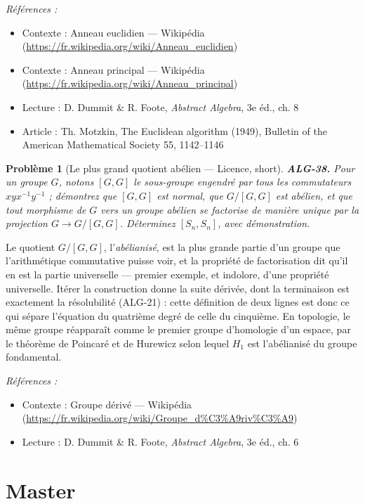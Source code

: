 \documentclass[11pt]{article}
\newtheorem{problem}{Problème}
\newenvironment{refs}{\par\small\noindent\emph{Références :}\begin{itemize}\setlength\itemsep{0pt}}{\end{itemize}\normalsize}
\begin{document}
\begin{refs}
\item Contexte : Anneau euclidien --- Wikipédia (\url{https://fr.wikipedia.org/wiki/Anneau_euclidien})
\item Contexte : Anneau principal --- Wikipédia (\url{https://fr.wikipedia.org/wiki/Anneau_principal})
\item Lecture : D. Dummit \& R. Foote, \textit{Abstract Algebra}, 3e éd., ch. 8
\item Article : Th. Motzkin, \og{} The Euclidean algorithm \fg{} (1949), Bulletin of the American Mathematical Society 55, 1142--1146
\end{refs}

\bigskip

\begin{problem}[{Le plus grand quotient abélien --- Licence, short}]
\textbf{ALG-38.} Pour un groupe $G$, notons $[G,G]$ le sous-groupe engendré par
tous les commutateurs $xyx^{-1}y^{-1}$ ; démontrez que $[G,G]$ est normal, que $G/[G,G]$ est abélien,
et que tout morphisme de $G$ vers un groupe abélien se factorise de manière unique par la projection
$G \to G/[G,G]$. Déterminez $[S_n, S_n]$, avec démonstration.
\end{problem}

\noindent Le quotient $G/[G,G]$, l'\textit{abélianisé}, est la plus grande partie d'un groupe que
l'arithmétique commutative puisse voir, et la propriété de factorisation dit qu'il en est la partie
universelle --- premier exemple, et indolore, d'une propriété universelle. Itérer la construction donne la
suite dérivée, dont la terminaison est exactement la résolubilité (ALG-21) : cette définition de deux lignes
est donc ce qui sépare l'équation du quatrième degré de celle du cinquième. En topologie, le même groupe
réapparaît comme le premier groupe d'homologie d'un espace, par le théorème de Poincaré et de Hurewicz selon
lequel $H_1$ est l'abélianisé du groupe fondamental.

\begin{refs}
\item Contexte : Groupe dérivé --- Wikipédia (\url{https://fr.wikipedia.org/wiki/Groupe_d%C3%A9riv%C3%A9})
\item Lecture : D. Dummit \& R. Foote, \textit{Abstract Algebra}, 3e éd., ch. 6
\end{refs}

\bigskip


\section*{Master}
\end{document}
